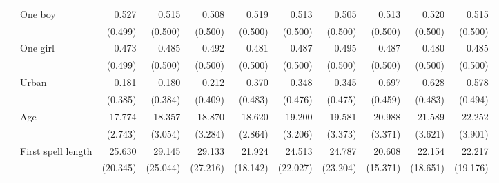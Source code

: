 \documentclass[12pt,letterpaper]{article}
\begin{document}
\begin{table}[htp]
\begin{center}
\begin{scriptsize}
\begin{threeparttable}
\begin{tabular} {@{} c l D{.}{.}{1.3} D{.}{.}{1.3} D{.}{.}{1.3} D{.}{.}{1.3} D{.}{.}{1.3} D{.}{.}{1.3} D{.}{.}{1.3} D{.}{.}{1.3} D{.}{.}{1.3} @{}}
                    & One boy             &       0.527         &       0.515         &       0.508         &       0.519         &       0.513         &       0.505         &       0.513         &       0.520         &       0.515         \\
                    &                     &     (0.499)         &     (0.500)         &     (0.500)         &     (0.500)         &     (0.500)         &     (0.500)         &     (0.500)         &     (0.500)         &     (0.500)         \\
                    & One girl            &       0.473         &       0.485         &       0.492         &       0.481         &       0.487         &       0.495         &       0.487         &       0.480         &       0.485         \\
                    &                     &     (0.499)         &     (0.500)         &     (0.500)         &     (0.500)         &     (0.500)         &     (0.500)         &     (0.500)         &     (0.500)         &     (0.500)         \\
                    & Urban               &       0.181         &       0.180         &       0.212         &       0.370         &       0.348         &       0.345         &       0.697         &       0.628         &       0.578         \\
                    &                     &     (0.385)         &     (0.384)         &     (0.409)         &     (0.483)         &     (0.476)         &     (0.475)         &     (0.459)         &     (0.483)         &     (0.494)         \\
                    & Age                 &      17.774         &      18.357         &      18.870         &      18.620         &      19.200         &      19.581         &      20.988         &      21.589         &      22.252         \\
                    &                     &     (2.743)         &     (3.054)         &     (3.284)         &     (2.864)         &     (3.206)         &     (3.373)         &     (3.371)         &     (3.621)         &     (3.901)         \\
                    & First spell length  &      25.630         &      29.145         &      29.133         &      21.924         &      24.513         &      24.787         &      20.608         &      22.154         &      22.217         \\
                    &                     &    (20.345)         &    (25.044)         &    (27.216)         &    (18.142)         &    (22.027)         &    (23.204)         &    (15.371)         &    (18.651)         &    (19.176)         \\

\end{tabular}
\end{threeparttable}
\end{scriptsize}
\end{center}
\end{table}
\end{document}
